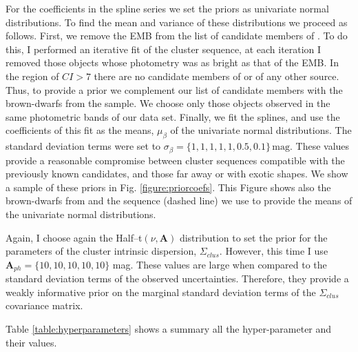 For the coefficients in the spline series we set the priors as univariate normal distributions. To find the mean and variance of these distributions we proceed as follows. First, we remove the EMB from the list of candidate members of \citet{Bouy2015}. To do this, I performed an iterative fit of the cluster sequence, at each iteration I removed those objects whose photometry was  as bright as that of the EMB. In the region of $CI > 7$ there are no candidate members of \citet{Bouy2015} or of any other source. Thus, to provide a prior we complement our list of candidate members with the brown-dwarfs from the \citet{Faherty2012} sample. We choose only those objects observed in the same photometric bands of our data set. Finally, we fit the splines, and use the coefficients of this fit as the means, $\mu_{\beta}$ of the univariate normal distributions. The standard deviation terms were set to $\sigma_{\beta}=\{1,1,1,1,1,0.5,0.1\}\,\mathrm{mag}$. These values provide a reasonable compromise between cluster sequences compatible with the previously known candidates, and those far away or with exotic shapes. We show a sample of these priors in Fig. \ref{figure:priorcoefs}. This Figure shows also the brown-dwarfs from \citet{Faherty2012} and the sequence (dashed line) we use to provide the means of the univariate normal distributions.

Again, I choose again the Half--t$(\nu,\boldsymbol{A})$ distribution to set the prior for the parameters of the cluster intrinsic dispersion, $\Sigma_{clus}$.  However, this time I use  $\boldsymbol{A}_{ph}=\{10,10,10,10,10\}$ mag. These values are large when compared to the standard deviation terms of the observed uncertainties. Therefore, they provide a weakly informative prior on the marginal standard deviation terms of the $\Sigma_{clus}$ covariance matrix.

Table \ref{table:hyperparameters} shows a summary all the hyper-parameter and their values.



